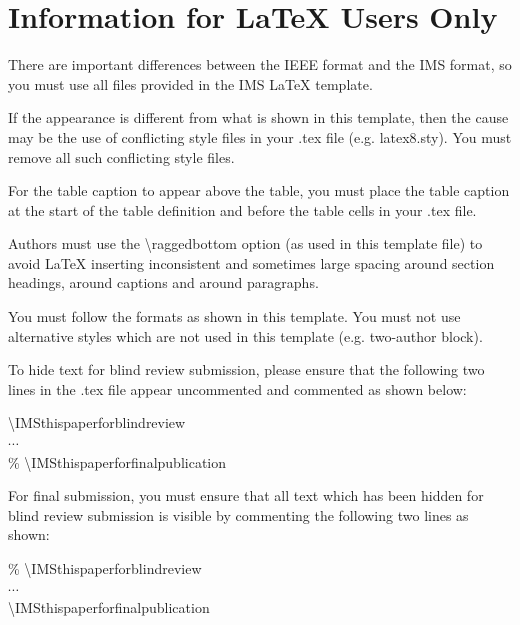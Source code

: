\documentclass[conference,10pt,letterpaper]{IEEEtran}%
\begin{document}

\section{Information for LaTeX Users Only}

There are important differences between the IEEE format and the IMS
format, so you must use all files provided in the IMS LaTeX template.

If the appearance is different from what is shown in this template,
then the cause may be the use of conflicting style files in your .tex
file (e.g. latex8.sty).  You must remove all such conflicting style
files.

For the table caption to appear above the table, you must place the
table caption at the start of the table definition and before the
table cells in your .tex file.


Authors must use the {\textbackslash}raggedbottom option (as used in
this template file) to avoid LaTeX inserting inconsistent and
sometimes large spacing around section headings, around captions and
around paragraphs.

You must follow the formats as shown in this template.  You must not
use alternative styles which are not used in this template (e.g.
two-author block).

To hide text for blind review submission, please ensure that the following
two lines in the .tex file appear uncommented and commented as shown
below:\\
\hspace*{\parindent}\parbox[t]{2in}{%
{\textbackslash}IMSthispaperforblindreview\\
$\cdots$\\
\% {\textbackslash}IMSthispaperforfinalpublication\strut
}

For final submission, you must ensure that all text which has been
hidden for blind review submission is visible by commenting the following
two lines as shown:

\noindent\hspace*{\parindent}\parbox[t]{2in}{%
\% {\textbackslash}IMSthispaperforblindreview\\
$\cdots$\\
{\textbackslash}IMSthispaperforfinalpublication
}
\end{document}
